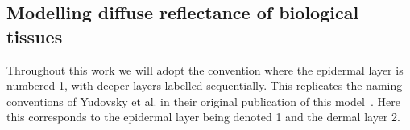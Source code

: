 
\subsection{Modelling diffuse reflectance of biological tissues}\label{sec:methodtissuemodeldouble}
Throughout this work we will adopt the convention where the epidermal layer is numbered 1, with deeper layers labelled sequentially. This replicates the naming conventions of Yudovsky et al. in their original publication of this model~\cite{Yudovsky2009}. Here this corresponds to the epidermal layer being denoted 1 and the dermal layer 2. 
%
